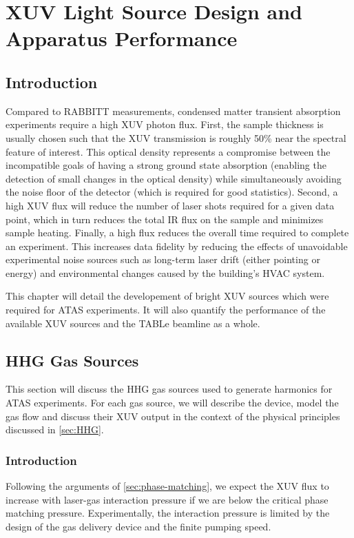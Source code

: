 \chapter{XUV Light Source Design and Apparatus Performance}

\section{Introduction}

Compared to RABBITT measurements, condensed matter transient absorption experiments require a high XUV photon flux. First, the sample thickness is usually chosen such that the XUV transmission is roughly 50\% near the spectral feature of interest. This optical density represents a compromise between the incompatible goals of having a strong ground state absorption (enabling the detection of small changes in the optical density) while simultaneously avoiding the noise floor of the detector (which is required for good statistics). Second, a high XUV flux will reduce the number of laser shots required for a given data point, which in turn reduces the total IR flux on the sample and minimizes sample heating. Finally, a high flux reduces the overall time required to complete an experiment. This increases data fidelity by reducing the effects of unavoidable experimental noise sources such as long-term laser drift (either pointing or energy) and environmental changes caused by the building's HVAC system.

This chapter will detail the developement of bright XUV sources which were required for ATAS experiments. It will also quantify the performance of the available XUV sources and the TABLe beamline as a whole.

\section{HHG Gas Sources}
\label{sec:HHG_gas_sources}

This section will discuss the HHG gas sources used to generate harmonics for ATAS experiments. For each gas source, we will describe the device, model the gas flow and discuss their XUV output in the context of the physical principles discussed in \cref{sec:HHG}.

\subsection{Introduction}


Following the arguments of \cref{sec:phase-matching}, we expect the XUV flux to increase with laser-gas interaction pressure if we are below the critical phase matching pressure. Experimentally, the interaction pressure is limited by the design of the gas delivery device and the finite pumping speed.

